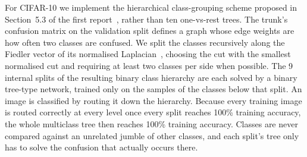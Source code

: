 For CIFAR-10 we implement the hierarchical class-grouping scheme proposed in Section~5.3 of the first
report~\cite{saini2026tree},
rather than ten one-vs-rest trees. The trunk's confusion matrix on the validation split defines a graph whose
edge weights are how often two classes are confused. We split the classes recursively along the Fiedler vector
of its normalised Laplacian~\cite{shi2000normalized,vonluxburg2007tutorial}, choosing the cut with the smallest normalised cut and requiring at least two
classes per side when possible. The 9 internal splits of the resulting binary class hierarchy are each solved
by a binary tree-type network, trained only on the samples of the classes below that split. An image is
classified by routing it down the hierarchy. Because every training image is routed correctly at every level
once every split reaches 100\% training accuracy, the whole multiclass tree then reaches 100\% training
accuracy. Classes are never compared against an unrelated jumble of other classes, and each split's tree only
has to solve the confusion that actually occurs there.
